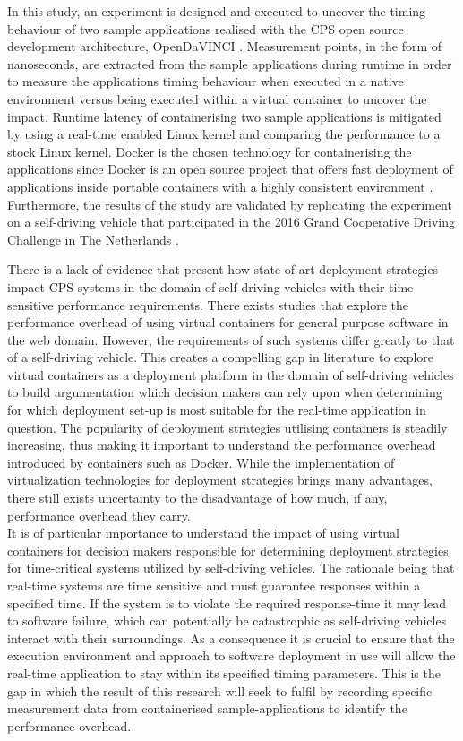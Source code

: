 In this study, an experiment is designed and executed to uncover the timing behaviour of two sample applications realised with the CPS open source development architecture, OpenDaVINCI \cite{OpenDaVINCI}. Measurement points, in the form of nanoseconds, are extracted from the sample applications during runtime in order to measure the applications timing behaviour when executed in a native environment versus being executed within a virtual container to uncover the impact. Runtime latency of containerising two sample applications is mitigated by using a real-time enabled Linux kernel and comparing the performance to a stock Linux kernel. Docker \cite{whatdocker} is the chosen technology for containerising the applications since Docker is an open source project that offers fast deployment of applications inside portable containers with a highly consistent environment \cite{bernstein2014containers}. Furthermore, the results of the study are validated by replicating the experiment on a self-driving vehicle that participated in the 2016 Grand Cooperative Driving Challenge in The Netherlands \cite{gcdc}.

There is a lack of evidence that present how state-of-art deployment strategies impact CPS systems in the domain of self-driving vehicles with their time sensitive performance requirements. There exists studies that explore the performance overhead of using virtual containers for general purpose software in the web domain. However, the requirements of such systems differ greatly to that of a self-driving vehicle. This creates a compelling gap in literature to explore virtual containers as a deployment platform in the domain of self-driving vehicles to build argumentation which decision makers can rely upon when determining for which deployment set-up is most suitable for the real-time application in question. The popularity of deployment strategies utilising containers is steadily increasing, thus making it important to understand the performance overhead introduced by containers such as Docker. While the implementation of virtualization technologies for deployment strategies brings many advantages, there still exists uncertainty to the disadvantage of how much, if any, performance overhead they carry.\\

It is of particular importance to understand the impact of using virtual containers for decision makers responsible for determining deployment strategies for time-critical systems utilized by self-driving vehicles. The rationale being that real-time systems are time sensitive and must guarantee responses within a specified time. If the system is to violate the required response-time it may lead to software failure, which can potentially be catastrophic as self-driving vehicles interact with their surroundings. As a consequence it is crucial to ensure that the execution environment and approach to software deployment in use will allow the real-time application to stay within its specified timing parameters. This is the gap in which the result of this research will seek to fulfil by recording specific measurement data from containerised sample-applications to identify the performance overhead.

